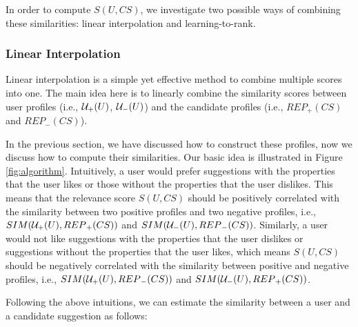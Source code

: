 In order to compute $S(U,CS)$, we investigate two 
possible ways of combining these similarities: 
linear interpolation and learning-to-rank. 


\subsubsection{Linear Interpolation} 
\label{sec:linear_interpolation}


Linear interpolation is a simple yet 
effective method to combine multiple scores 
into one.  
The main idea here is to linearly 
combine the similarity scores between user profiles 
(i.e., ${\cal U}_{+}(U)$, ${\cal U}_{-}(U)$) and the 
candidate profiles 
(i.e., ${REP}_{+}(CS)$ and ${REP}_{-}(CS)$). 


In the previous section, we have discussed how to construct these profiles, 
now we discuss how to compute their similarities. Our basic idea is illustrated
in Figure \ref{fig:algorithm}. Intuitively, a user would prefer 
suggestions with the properties that the user likes or those without 
the properties that the user dislikes. This means that the relevance 
score $S(U,CS)$ should be positively correlated with the similarity 
between two positive profiles and two negative profiles, i.e., 
$SIM({\cal U}_{+}(U),{REP}_{+}(CS))$ 
and $SIM({\cal U}_{-}(U),{REP}_{-}(CS))$. Similarly, a user would not 
like suggestions with the properties that the user dislikes or 
suggestions without the properties that the user likes, which means 
$S(U,CS)$ should be negatively correlated with the similarity between 
positive and negative profiles, i.e., $SIM({\cal U}_{+}(U),{REP}_{-}(CS))$ 
and $SIM({\cal U}_{-}(U),{REP}_{+}(CS))$. 


Following the above intuitions, we can estimate the similarity between a user and a candidate suggestion as follows: 

